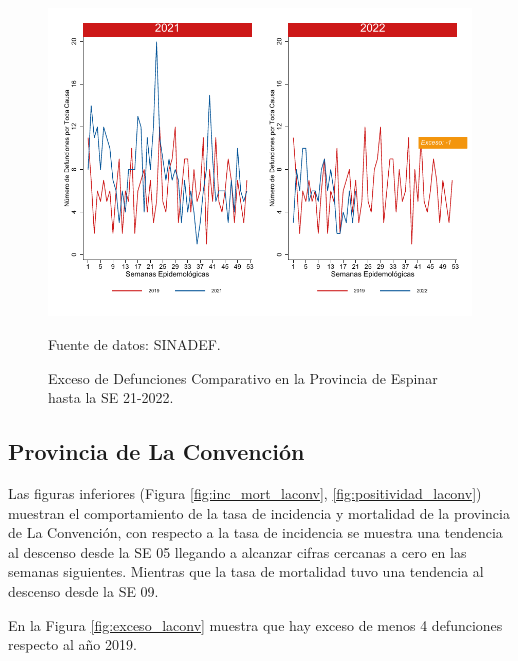 \documentclass[12pt,a4paper,openany]{book}
\begin{document}
	\begin{figure}[h]
		\caption{Exceso de Defunciones Comparativo en la Provincia de Espinar hasta la SE 21-2022.}\label{fig:exceso_espinar}
		\begin{center}
			\includegraphics[width=0.7\linewidth]{../figuras/exceso_8.pdf}
		\end{center}
		{\footnotesize {Fuente de datos: SINADEF.}}
	\end{figure}
	
	\clearpage
	
	\subsection*{Provincia de La Convención}
	\noindent Las figuras inferiores (Figura \ref{fig:inc_mort_laconv}, \ref{fig:positividad_laconv}) muestran el comportamiento de la tasa de incidencia y mortalidad de la provincia de La Convención, con respecto a la tasa de incidencia se muestra una tendencia al descenso desde la SE 05 llegando a alcanzar cifras cercanas a cero en las semanas siguientes. Mientras que la tasa de mortalidad tuvo una tendencia al descenso desde la SE 09.  
	
	En la Figura \ref{fig:exceso_laconv}  muestra que hay exceso de menos 4 defunciones respecto al año 2019.     
	
\end{document}
